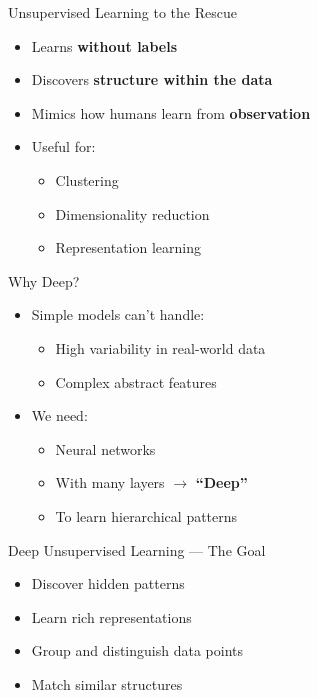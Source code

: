 \begin{frame}{Unsupervised Learning to the Rescue}
    \begin{itemize}
        \item Learns \textbf{without labels}
        \item Discovers \textbf{structure within the data}
        \item Mimics how humans learn from \textbf{observation}
        \item Useful for:
        \begin{itemize}
            \item Clustering
            \item Dimensionality reduction
            \item Representation learning
        \end{itemize}
    \end{itemize}
\end{frame}

\begin{frame}{Why Deep?}
    \begin{itemize}
        \item Simple models can’t handle:
        \begin{itemize}
            \item High variability in real-world data
            \item Complex abstract features
        \end{itemize}
        \item We need:
        \begin{itemize}
            \item Neural networks
            \item With many layers $\rightarrow$ \textbf{``Deep''}
            \item To learn hierarchical patterns
        \end{itemize}
    \end{itemize}
\end{frame}


\begin{frame}{Deep Unsupervised Learning --- The Goal}
    \begin{itemize}
        \item Discover hidden patterns
        \item Learn rich representations
        \item Group and distinguish data points
        \item Match similar structures
    \end{itemize}
\end{frame}